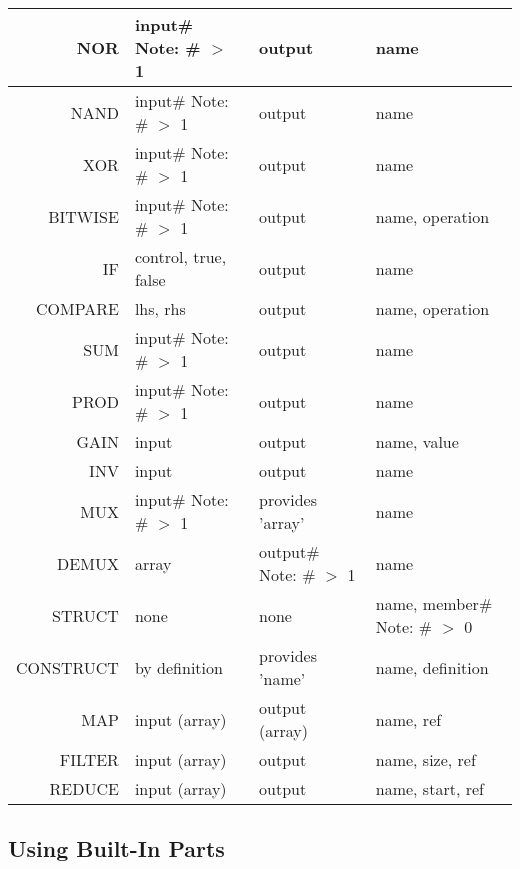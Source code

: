 \documentclass[titlepage]{article}
\makeatletter
\newcommand{\specialcell}[2][l]{%
      \begin{tabular}[#1]{@{}c@{}}#2\end{tabular}
}
\makeatother
\begin{document}
\begin{longtable}[c]{ |r|l|l|l| }
    \hline
    NOR & \specialcell{input\# \\ Note: \# $>$ 1} & output & name \\
    \hline
    NAND & \specialcell{input\# \\ Note: \# $>$ 1} & output & name \\
    \hline
    XOR & \specialcell{input\# \\ Note: \# $>$ 1} & output & name \\
    \hline
    BITWISE & \specialcell{input\# \\ Note: \# $>$ 1} & output & name, operation \\
    \hline
    IF & control, true, false & output & name \\
    \hline
    COMPARE & lhs, rhs  & output & name, operation \\
    \hline
    SUM & \specialcell{input\# \\ Note: \# $>$ 1} & output & name \\
    \hline
    PROD & \specialcell{input\# \\ Note: \# $>$ 1} & output & name \\
    \hline
    GAIN & input & output & name, value \\
    \hline
    INV & input & output & name \\
    \hline
    \hline
    MUX & \specialcell{input\# \\ Note: \# $>$ 1} & provides 'array' & name \\
    \hline
    DEMUX & array & \specialcell{output\# \\ Note: \# $>$ 1} & name \\
    \hline
    STRUCT & none & none & name, \specialcell{member\# \\ Note: \# $>$ 0} \\
    \hline
    CONSTRUCT & by definition & provides 'name' & name, definition \\
    \hline
    \hline
    MAP & input (array) & output (array) & name, ref \\
    \hline
    FILTER & input (array) & output & name, size, ref \\
    \hline
    REDUCE & input (array) & output & name, start, ref \\
    \hline
\end{longtable}
\subsection{Using Built-In Parts}
\end{document}
